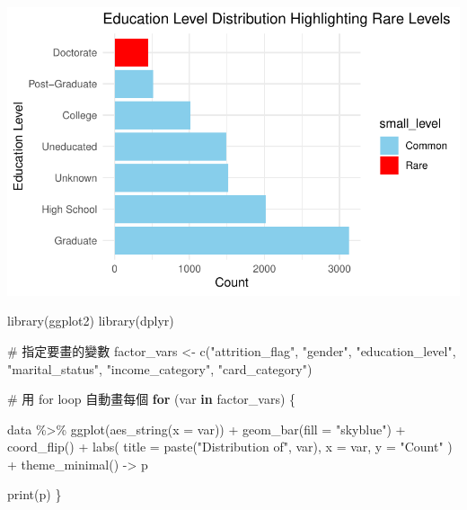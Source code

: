 \documentclass[
  letterpaper,
  DIV=11,
  numbers=noendperiod]{scrartcl}
\newenvironment{Shaded}{\begin{snugshade}}{\end{snugshade}}
\newcommand{\AttributeTok}[1]{\textcolor[rgb]{0.40,0.45,0.13}{#1}}
\newcommand{\CommentTok}[1]{\textcolor[rgb]{0.37,0.37,0.37}{#1}}
\newcommand{\ControlFlowTok}[1]{\textcolor[rgb]{0.00,0.23,0.31}{\textbf{#1}}}
\newcommand{\FunctionTok}[1]{\textcolor[rgb]{0.28,0.35,0.67}{#1}}
\newcommand{\NormalTok}[1]{\textcolor[rgb]{0.00,0.23,0.31}{#1}}
\newcommand{\OtherTok}[1]{\textcolor[rgb]{0.00,0.23,0.31}{#1}}
\newcommand{\SpecialCharTok}[1]{\textcolor[rgb]{0.37,0.37,0.37}{#1}}
\newcommand{\StringTok}[1]{\textcolor[rgb]{0.13,0.47,0.30}{#1}}
\begin{document}
\includegraphics{Tackling-Attrition-at-Tifosi-Bank_files/figure-pdf/unnamed-chunk-7-2.pdf}

\begin{Shaded}
\begin{Highlighting}[]
\FunctionTok{library}\NormalTok{(ggplot2)}
\FunctionTok{library}\NormalTok{(dplyr)}

\CommentTok{\# 指定要畫的變數}
\NormalTok{factor\_vars }\OtherTok{\textless{}{-}} \FunctionTok{c}\NormalTok{(}\StringTok{"attrition\_flag"}\NormalTok{, }\StringTok{"gender"}\NormalTok{, }\StringTok{"education\_level"}\NormalTok{, }
                 \StringTok{"marital\_status"}\NormalTok{, }\StringTok{"income\_category"}\NormalTok{, }\StringTok{"card\_category"}\NormalTok{)}

\CommentTok{\# 用 for loop 自動畫每個}
\ControlFlowTok{for}\NormalTok{ (var }\ControlFlowTok{in}\NormalTok{ factor\_vars) \{}
  
\NormalTok{  data }\SpecialCharTok{\%\textgreater{}\%}
    \FunctionTok{ggplot}\NormalTok{(}\FunctionTok{aes\_string}\NormalTok{(}\AttributeTok{x =}\NormalTok{ var)) }\SpecialCharTok{+}
    \FunctionTok{geom\_bar}\NormalTok{(}\AttributeTok{fill =} \StringTok{"skyblue"}\NormalTok{) }\SpecialCharTok{+}
    \FunctionTok{coord\_flip}\NormalTok{() }\SpecialCharTok{+}
    \FunctionTok{labs}\NormalTok{(}
      \AttributeTok{title =} \FunctionTok{paste}\NormalTok{(}\StringTok{"Distribution of"}\NormalTok{, var),}
      \AttributeTok{x =}\NormalTok{ var,}
      \AttributeTok{y =} \StringTok{"Count"}
\NormalTok{    ) }\SpecialCharTok{+}
    \FunctionTok{theme\_minimal}\NormalTok{() }\OtherTok{{-}\textgreater{}}\NormalTok{ p}
  
  \FunctionTok{print}\NormalTok{(p)}
\NormalTok{\}}
\end{Highlighting}
\end{Shaded}
\end{document}
